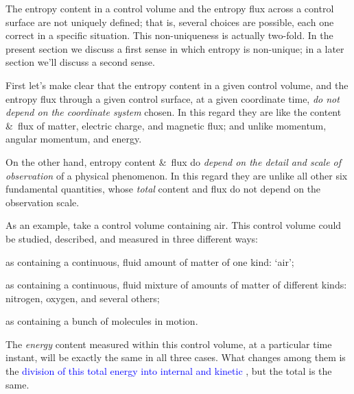 \documentclass[a4paper,12pt,%
onecolumn,oneside,%
british%
]{memoir}
\newcommand*{\amp}{\&}
\renewcommand*{\|}[1][]{\nonscript\:#1\vert\nonscript\:\mathopen{}}
\newcommand*{\sect}{\S}%
\renewcommand*{\autoref}[3][\sect\,\ref]{\textcolor{blue}{#3}
\raisebox{0.6ex}{\color{blue}\miniscule%
\faIcon{angle-right}%
\;#1{#2}\;p.\,\pageref{#2}}}
\begin{document}
The entropy content in a control volume and the entropy flux across a control surface are not uniquely defined; that is, several choices are possible, each one correct in a specific situation. This non-uniqueness is actually two-fold. In the present section we discuss a first sense in which entropy is non-unique; in a later section we'll discuss a second sense.

First let's make clear that the entropy content in a given control volume, and the entropy flux through a given control surface, at a given coordinate time, \emph{do not depend on the coordinate system} chosen. In this regard they are like the content \amp\ flux of matter, electric charge, and magnetic flux; and unlike momentum, angular momentum, and energy.

On the other hand, entropy content \amp\ flux do \emph{depend on the detail and scale of observation} of a physical phenomenon. In this regard they are unlike all other six fundamental quantities, whose \emph{total} content and flux do not depend on the observation scale.

As an example, %
take a control volume containing air. This control volume could be studied, described, and measured in three different ways:
\begin{enumerate*}[label=(\alph*)]
\item as containing a continuous, fluid amount of matter of one kind: \enquote*{air}; \item as containing a continuous, fluid mixture of amounts of matter of different kinds: nitrogen, oxygen, and several others; \item as containing a bunch of molecules in motion.
\end{enumerate*}

The \emph{energy} content measured within this control volume, at a particular time instant, will be exactly the same in all three cases. What changes among them is the \autoref{sec:dependence_energycontentdivision}{division of this total energy into internal and kinetic}, but the total is the same.
\end{document}
